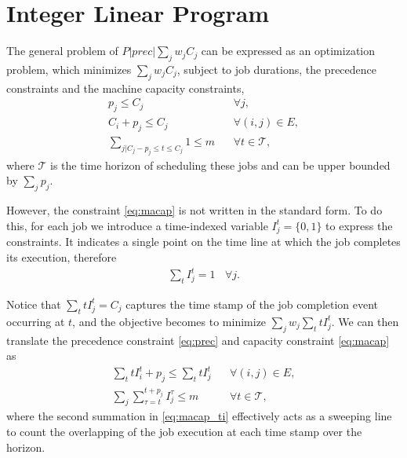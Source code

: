 \section{Integer Linear Program} \label{s:ilp}
The general problem of $P|prec|\sum_j w_jC_j$ can be expressed as an optimization problem, which minimizes $\sum_j w_jC_j$, subject to job durations, the precedence constraints and the machine capacity constraints,
\begin{align}
p_j \leq C_j& \:\:\:\: \forall j, \label{eq:ptime}\\
C_i + p_j\leq C_j&  \:\:\:\: \forall (i,j) \in E, \label{eq:prec}\\
\sum_{j | C_j - p_j \leq t \leq C_j} 1 \leq m& \:\:\:\: \forall t \in \mathcal{T}, \label{eq:macap}
\end{align}
where $\mathcal{T}$ is the time horizon of scheduling these jobs and can be upper bounded by $\sum_j p_j$. 

However, the constraint \eqref{eq:macap} is not written in the standard form. To do this, for each job we introduce a time-indexed variable $I_j^t = \{0, 1\}$ to express the constraints. It indicates a single point on the time line at which the job completes its execution, therefore
\begin{align}
\sum_t I_j^t = 1 \:\:\:\: \forall j. 
\end{align}

Notice that $\sum_t tI_j^t = C_j$ captures the time stamp of the job completion event occurring at $t$, and the objective becomes to minimize $\sum_j w_j \sum_t tI_j^t$. We can then translate the precedence constraint \eqref{eq:prec} and capacity constraint \eqref{eq:macap} as 
\begin{align}
\sum_t t I^t_i + p_j \leq \sum_t tI^t_j& \:\:\:\: \forall (i,j) \in E, \label{eq:prec_ti}\\
\sum_{j} \sum_{\tau=t}^{t + p_j} I^\tau_j \leq m& \:\:\:\: \forall t \in \mathcal{T}, \label{eq:macap_ti}
\end{align}
where the second summation in \eqref{eq:macap_ti} effectively acts as a sweeping line to count the overlapping of the job execution at each time stamp over the horizon. 

